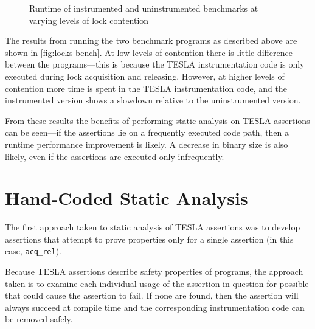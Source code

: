 \begin{figure}[ht]
  \centering
  \caption{Runtime of instrumented and uninstrumented benchmarks at
  varying levels of lock contention}
  \label{fig:locks-bench}
\end{figure}

The results from running the two benchmark programs as described above
are shown in \autoref{fig:locks-bench}. At low levels of contention
there is little difference between the programs---this is because the
TESLA instrumentation code is only executed during lock acquisition and
releasing. However, at higher levels of contention more time is spent in
the TESLA instrumentation code, and the instrumented version shows a
slowdown relative to the uninstrumented version.

From these results the benefits of performing static analysis on TESLA
assertions can be seen---if the assertions lie on a frequently executed code
path, then a runtime performance improvement is likely. A decrease in
binary size is also likely, even if the assertions are executed only
infrequently.

\section{Hand-Coded Static Analysis} \label{sec:hand-coded}

The first approach taken to static analysis of TESLA assertions was to develop
 assertions that attempt to prove properties only for a
single assertion (in this case, \texttt{acq_rel}).

Because TESLA assertions describe safety properties of programs, the approach
taken is to examine each individual usage of the assertion in question for
possible  that could cause the assertion to fail. If none
are found, then the assertion will always succeed at compile time and the
corresponding instrumentation code can be removed safely.

